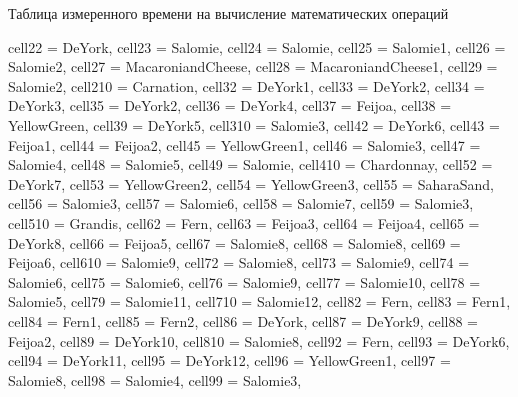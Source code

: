 


\begin{table}[H]
	\centering
	\caption{Таблица измеренного времени на вычисление математических операций}\label{TestTimeT}

	\begin{adjustbox}{width=\textwidth}

		\begin{tblr}{
				cell{2}{2} = {DeYork},
				cell{2}{3} = {Salomie},
				cell{2}{4} = {Salomie},
				cell{2}{5} = {Salomie1},
				cell{2}{6} = {Salomie2},
				cell{2}{7} = {MacaroniandCheese},
				cell{2}{8} = {MacaroniandCheese1},
				cell{2}{9} = {Salomie2},
				cell{2}{10} = {Carnation},
				cell{3}{2} = {DeYork1},
				cell{3}{3} = {DeYork2},
				cell{3}{4} = {DeYork3},
				cell{3}{5} = {DeYork2},
				cell{3}{6} = {DeYork4},
				cell{3}{7} = {Feijoa},
				cell{3}{8} = {YellowGreen},
				cell{3}{9} = {DeYork5},
				cell{3}{10} = {Salomie3},
				cell{4}{2} = {DeYork6},
				cell{4}{3} = {Feijoa1},
				cell{4}{4} = {Feijoa2},
				cell{4}{5} = {YellowGreen1},
				cell{4}{6} = {Salomie3},
				cell{4}{7} = {Salomie4},
				cell{4}{8} = {Salomie5},
				cell{4}{9} = {Salomie},
				cell{4}{10} = {Chardonnay},
				cell{5}{2} = {DeYork7},
				cell{5}{3} = {YellowGreen2},
				cell{5}{4} = {YellowGreen3},
				cell{5}{5} = {SaharaSand},
				cell{5}{6} = {Salomie3},
				cell{5}{7} = {Salomie6},
				cell{5}{8} = {Salomie7},
				cell{5}{9} = {Salomie3},
				cell{5}{10} = {Grandis},
				cell{6}{2} = {Fern},
				cell{6}{3} = {Feijoa3},
				cell{6}{4} = {Feijoa4},
				cell{6}{5} = {DeYork8},
				cell{6}{6} = {Feijoa5},
				cell{6}{7} = {Salomie8},
				cell{6}{8} = {Salomie8},
				cell{6}{9} = {Feijoa6},
				cell{6}{10} = {Salomie9},
				cell{7}{2} = {Salomie8},
				cell{7}{3} = {Salomie9},
				cell{7}{4} = {Salomie6},
				cell{7}{5} = {Salomie6},
				cell{7}{6} = {Salomie9},
				cell{7}{7} = {Salomie10},
				cell{7}{8} = {Salomie5},
				cell{7}{9} = {Salomie11},
				cell{7}{10} = {Salomie12},
				cell{8}{2} = {Fern},
				cell{8}{3} = {Fern1},
				cell{8}{4} = {Fern1},
				cell{8}{5} = {Fern2},
				cell{8}{6} = {DeYork},
				cell{8}{7} = {DeYork9},
				cell{8}{8} = {Feijoa2},
				cell{8}{9} = {DeYork10},
				cell{8}{10} = {Salomie8},
				cell{9}{2} = {Fern},
				cell{9}{3} = {DeYork6},
				cell{9}{4} = {DeYork11},
				cell{9}{5} = {DeYork12},
				cell{9}{6} = {YellowGreen1},
				cell{9}{7} = {Salomie8},
				cell{9}{8} = {Salomie4},
				cell{9}{9} = {Salomie3},
}
\end{tblr}
\end{adjustbox}
\end{table}
